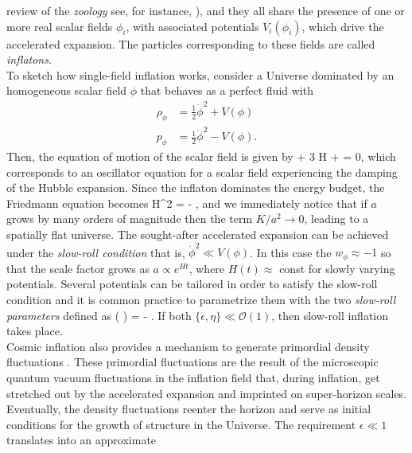 review of the \emph{zoology} see, for instance, \cite{Martin2014}), and they all share the
presence of one or more real scalar fields $\phi_i$, with associated potentials $V_i(\phi_i)$, which 
drive the accelerated expansion. The particles corresponding to these fields are called \emph{inflatons}.\\
To sketch how single-field inflation works, consider a Universe dominated by an homogeneous scalar field 
$\phi$ that behaves as a perfect fluid with 
%
\begin{align}
\rho_{\phi} &= \frac{1}{2}\dot{\phi}^2 + V(\phi) \\
p_{\phi} &= \frac{1}{2}\dot{\phi}^2 - V(\phi).
\end{align}
%
Then, the equation of motion of the scalar field is given by 
%
\be
\ddot{\phi} + 3 H\dot{\phi} +  = 0,
\ee
%
which corresponds to an oscillator equation for a scalar field experiencing the damping of the Hubble 
expansion. Since the inflaton dominates the energy budget, the Friedmann equation becomes
%
\be
H^2 =  - , 
\ee
%
and we immediately notice that if $a$ grows by many orders of magnitude then the term $K/a^2 \to 0$,
leading to a spatially flat universe. The sought-after accelerated expansion can be achieved under the
\emph{slow-roll condition} that is, $\dot{\phi}^2 \ll V(\phi)$. In this case the $w_{\phi}\approx -1$ so that 
the scale factor grows as $a \propto e^{Ht}$, where $H(t) \approx$ const for slowly varying potentials. 
Several potentials can be tailored in order to satisfy the slow-roll condition and it is common practice to 
parametrize them with the two \emph{slow-roll parameters} defined as 
%
\be
\epsilon \equiv {} \Bigl ( \Bigr) = -  \quad {} \quad \eta 
\equiv {}.
\ee
%
If both $\{\epsilon, \eta\} \ll \mathcal{O}(1)$, then slow-roll inflation takes place.\\ 
Cosmic inflation also provides a mechanism to generate primordial density fluctuations 
\cite{Starobinsky1982, Hawking1982, Bardeen1983}. 
These primordial fluctuations are the result of the microscopic quantum vacuum fluctuations in the inflation
field that, during inflation, get stretched out by the accelerated expansion and imprinted on super-horizon
scales. Eventually, the density fluctuations reenter the horizon and serve as initial conditions for the 
growth of structure in the Universe. The requirement $\epsilon \ll 1$ translates into an approximate 
